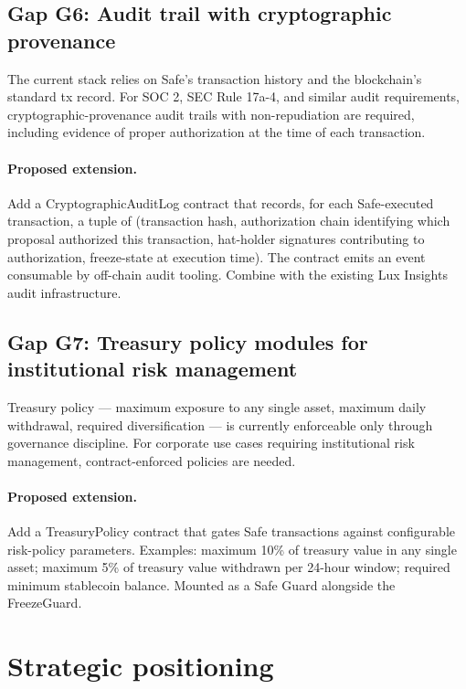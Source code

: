 \documentclass[11pt,letterpaper]{article}
\begin{document}
\subsection{Gap G6: Audit trail with cryptographic provenance}

The current stack relies on Safe's transaction history and the blockchain's standard tx record. For SOC 2, SEC Rule 17a-4, and similar audit requirements, cryptographic-provenance audit trails with non-repudiation are required, including evidence of proper authorization at the time of each transaction.

\paragraph{Proposed extension.} Add a CryptographicAuditLog contract that records, for each Safe-executed transaction, a tuple of (transaction hash, authorization chain identifying which proposal authorized this transaction, hat-holder signatures contributing to authorization, freeze-state at execution time). The contract emits an event consumable by off-chain audit tooling. Combine with the existing Lux Insights audit infrastructure.

\subsection{Gap G7: Treasury policy modules for institutional risk management}

Treasury policy --- maximum exposure to any single asset, maximum daily withdrawal, required diversification --- is currently enforceable only through governance discipline. For corporate use cases requiring institutional risk management, contract-enforced policies are needed.

\paragraph{Proposed extension.} Add a TreasuryPolicy contract that gates Safe transactions against configurable risk-policy parameters. Examples: maximum 10\% of treasury value in any single asset; maximum 5\% of treasury value withdrawn per 24-hour window; required minimum stablecoin balance. Mounted as a Safe Guard alongside the FreezeGuard.

\section{Strategic positioning}
\end{document}
